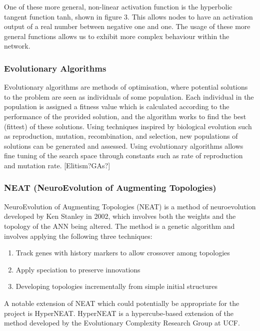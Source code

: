 \documentclass[11pt,a4paper]{article}
\begin{document}
One of these more general, non-linear activation function is the hyperbolic tangent function tanh, shown in figure 3. This allows nodes to have an activation output of a real number between negative one and one. The usage of these more general functions allows us to exhibit more complex behaviour within the network.
\begin{figure}[h]
\end{figure}
\newpage
\subsubsection{Evolutionary Algorithms}
Evolutionary algorithms are methods of optimisation, where potential solutions to the problem are seen as individuals of some population. Each individual in the population is assigned a fitness value which is calculated according to the performance of the provided solution, and the algorithm works to find the best (fittest) of these solutions. Using techniques inspired by biological evolution such as reproduction, mutation, recombination, and selection, new populations of solutions can be generated and assessed. Using evolutionary algorithms allows fine tuning of the search space through constants such as rate of reproduction and mutation rate. [Elitism?GAs?]

\subsubsection{NEAT (NeuroEvolution of Augmenting Topologies)}
NeuroEvolution of Augmenting Topologies (NEAT) is a method of neuroevolution developed by Ken Stanley in 2002, which involves both the weights and the topology of the ANN being altered. The method is a genetic algorithm and involves applying the following three techniques:
\begin{enumerate}
\item Track genes with history markers to allow crossover among topologies
\item Apply speciation to preserve innovations
\item Developing topologies incrementally from simple initial structures
\end{enumerate}
A notable extension of NEAT which could potentially be appropriate for the project is HyperNEAT. HyperNEAT is a hypercube-based extension of the method developed by the Evolutionary Complexity Research Group at UCF.
\newpage
\end{document}
